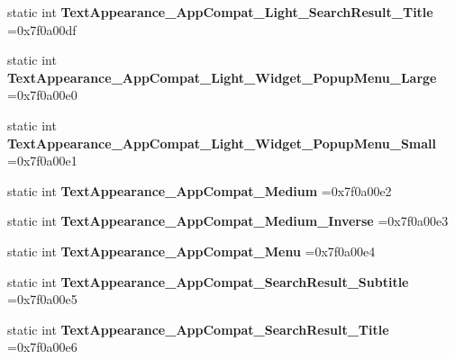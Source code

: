 \begin{DoxyCompactItemize}
static int {\bfseries Text\+Appearance\+\_\+\+App\+Compat\+\_\+\+Light\+\_\+\+Search\+Result\+\_\+\+Title} =0x7f0a00df
\item 
\mbox{\label{classandroid_1_1support_1_1v4_1_1R_1_1style_ad2b85979ffcb62068caa20fe70a166d0}} 
static int {\bfseries Text\+Appearance\+\_\+\+App\+Compat\+\_\+\+Light\+\_\+\+Widget\+\_\+\+Popup\+Menu\+\_\+\+Large} =0x7f0a00e0
\item 
\mbox{\label{classandroid_1_1support_1_1v4_1_1R_1_1style_a3de8138af883ce054607910d2775490b}} 
static int {\bfseries Text\+Appearance\+\_\+\+App\+Compat\+\_\+\+Light\+\_\+\+Widget\+\_\+\+Popup\+Menu\+\_\+\+Small} =0x7f0a00e1
\item 
\mbox{\label{classandroid_1_1support_1_1v4_1_1R_1_1style_a29766504cb793dad4b582f3ba45d4082}} 
static int {\bfseries Text\+Appearance\+\_\+\+App\+Compat\+\_\+\+Medium} =0x7f0a00e2
\item 
\mbox{\label{classandroid_1_1support_1_1v4_1_1R_1_1style_a238b617a465b124f664294ed4ecc43eb}} 
static int {\bfseries Text\+Appearance\+\_\+\+App\+Compat\+\_\+\+Medium\+\_\+\+Inverse} =0x7f0a00e3
\item 
\mbox{\label{classandroid_1_1support_1_1v4_1_1R_1_1style_aefb97cbacb638542e81c0dc4828ac2cb}} 
static int {\bfseries Text\+Appearance\+\_\+\+App\+Compat\+\_\+\+Menu} =0x7f0a00e4
\item 
\mbox{\label{classandroid_1_1support_1_1v4_1_1R_1_1style_a6e3a56a42d7729e97bd6e5510e5585a0}} 
static int {\bfseries Text\+Appearance\+\_\+\+App\+Compat\+\_\+\+Search\+Result\+\_\+\+Subtitle} =0x7f0a00e5
\item 
\mbox{\label{classandroid_1_1support_1_1v4_1_1R_1_1style_a1377fe62d05929ea672d2f6904e05da5}} 
static int {\bfseries Text\+Appearance\+\_\+\+App\+Compat\+\_\+\+Search\+Result\+\_\+\+Title} =0x7f0a00e6
\item 
\mbox{\label{classandroid_1_1support_1_1v4_1_1R_1_1style_a7e7838e8e5fe2ed1cb96671c4e7a4baa}} 

\end{DoxyCompactItemize}
